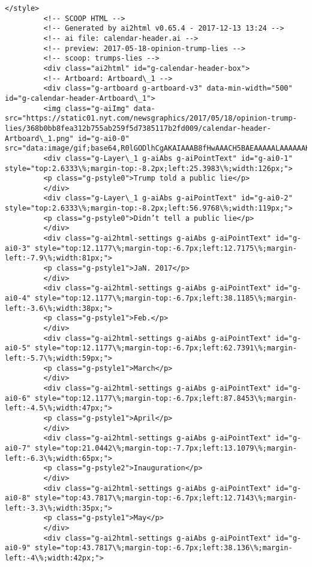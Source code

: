 \documentclass[11pt]{article}
\begin{document}
\begin{Verbatim}[commandchars=\\\{\}]
         </style>
         <!-- SCOOP HTML -->
         <!-- Generated by ai2html v0.65.4 - 2017-12-13 13:24 -->
         <!-- ai file: calendar-header.ai -->
         <!-- preview: 2017-05-18-opinion-trump-lies -->
         <!-- scoop: trumps-lies -->
         <div class="ai2html" id="g-calendar-header-box">
         <!-- Artboard: Artboard\_1 -->
         <div class="g-artboard g-artboard-v3" data-min-width="500" id="g-calendar-header-Artboard\_1">
         <img class="g-aiImg" data-src="https://static01.nyt.com/newsgraphics/2017/05/18/opinion-trump-lies/368b0bb8fea312b755ab259f5d7385117b2fd009/calendar-header-Artboard\_1.png" id="g-ai0-0" src="data:image/gif;base64,R0lGODlhCgAKAIAAAB8fHwAAACH5BAEAAAAALAAAAAAKAAoAAAIIhI+py+0PYysAOw=="/>
         <div class="g-Layer\_1 g-aiAbs g-aiPointText" id="g-ai0-1" style="top:2.6333\%;margin-top:-8.2px;left:25.3983\%;width:126px;">
         <p class="g-pstyle0">Trump told a public lie</p>
         </div>
         <div class="g-Layer\_1 g-aiAbs g-aiPointText" id="g-ai0-2" style="top:2.6333\%;margin-top:-8.2px;left:56.9768\%;width:119px;">
         <p class="g-pstyle0">Didn’t tell a public lie</p>
         </div>
         <div class="g-ai2html-settings g-aiAbs g-aiPointText" id="g-ai0-3" style="top:12.1177\%;margin-top:-6.7px;left:12.7175\%;margin-left:-7.9\%;width:81px;">
         <p class="g-pstyle1">JaN. 2017</p>
         </div>
         <div class="g-ai2html-settings g-aiAbs g-aiPointText" id="g-ai0-4" style="top:12.1177\%;margin-top:-6.7px;left:38.1185\%;margin-left:-3.6\%;width:38px;">
         <p class="g-pstyle1">Feb.</p>
         </div>
         <div class="g-ai2html-settings g-aiAbs g-aiPointText" id="g-ai0-5" style="top:12.1177\%;margin-top:-6.7px;left:62.7391\%;margin-left:-5.7\%;width:59px;">
         <p class="g-pstyle1">March</p>
         </div>
         <div class="g-ai2html-settings g-aiAbs g-aiPointText" id="g-ai0-6" style="top:12.1177\%;margin-top:-6.7px;left:87.8453\%;margin-left:-4.5\%;width:47px;">
         <p class="g-pstyle1">April</p>
         </div>
         <div class="g-ai2html-settings g-aiAbs g-aiPointText" id="g-ai0-7" style="top:21.0442\%;margin-top:-7.7px;left:13.1079\%;margin-left:-6.3\%;width:65px;">
         <p class="g-pstyle2">Inauguration</p>
         </div>
         <div class="g-ai2html-settings g-aiAbs g-aiPointText" id="g-ai0-8" style="top:43.7817\%;margin-top:-6.7px;left:12.7143\%;margin-left:-3.3\%;width:35px;">
         <p class="g-pstyle1">May</p>
         </div>
         <div class="g-ai2html-settings g-aiAbs g-aiPointText" id="g-ai0-9" style="top:43.7817\%;margin-top:-6.7px;left:38.136\%;margin-left:-4\%;width:42px;">

\end{Verbatim}
\end{document}
